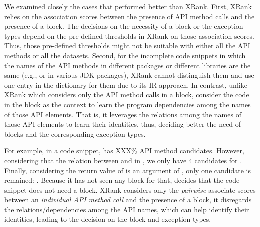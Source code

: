 We examined closely the cases that {\tool} performed better than
XRank.  First, XRank relies on the association scores between the
presence of API method calls and the presence of a 
block. The decisions on the necessity of a  block or
the exception types depend on the pre-defined thresholds in XRank on
those association scores. Thus, those pre-defined thresholds might not
be suitable with either all the API methods or all the
datasets. Second, for the incomplete code snippets in which the names
of the API methods in different packages or different libraries are
the same (e.g.,  or  in various JDK
packages), XRank cannot distinguish them and use one entry in the
dictionary for them due to its IR approach. In contrast, unlike XRank
which considers only the API method calls in a  block,
{\tool} consider the code in the block as the context to learn the
program dependencies among the names of those API elements. That is,
it leverages the relations among the names of those API elements to
learn their identities, thus, deciding better the need of
 blocks and the corresponding exception types.

For example, in a code snippet,  has XXX\% API method
candidates. However, considering that the relation between 
and  in , we only have 4
candidates for . Finally, considering the return value
of  is an argument of , only one
candidate is remained:
.
Because it has not seen any  block for that, {\tool}
decides that the code snippet does not need a  block.
XRank considers only the {\em pairwise} associate scores between an
{\em individual API method call} and the presence of a
 block, it disregards the relations/dependencies among
the API names, which can help identify their identities, leading to
the decision on the  block and exception types.
